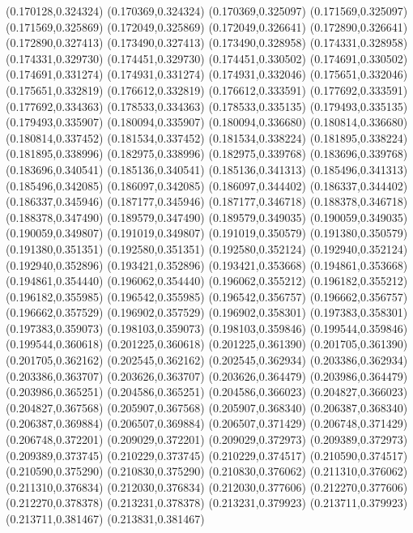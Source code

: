 (0.170128,0.324324)
(0.170369,0.324324)
(0.170369,0.325097)
(0.171569,0.325097)
(0.171569,0.325869)
(0.172049,0.325869)
(0.172049,0.326641)
(0.172890,0.326641)
(0.172890,0.327413)
(0.173490,0.327413)
(0.173490,0.328958)
(0.174331,0.328958)
(0.174331,0.329730)
(0.174451,0.329730)
(0.174451,0.330502)
(0.174691,0.330502)
(0.174691,0.331274)
(0.174931,0.331274)
(0.174931,0.332046)
(0.175651,0.332046)
(0.175651,0.332819)
(0.176612,0.332819)
(0.176612,0.333591)
(0.177692,0.333591)
(0.177692,0.334363)
(0.178533,0.334363)
(0.178533,0.335135)
(0.179493,0.335135)
(0.179493,0.335907)
(0.180094,0.335907)
(0.180094,0.336680)
(0.180814,0.336680)
(0.180814,0.337452)
(0.181534,0.337452)
(0.181534,0.338224)
(0.181895,0.338224)
(0.181895,0.338996)
(0.182975,0.338996)
(0.182975,0.339768)
(0.183696,0.339768)
(0.183696,0.340541)
(0.185136,0.340541)
(0.185136,0.341313)
(0.185496,0.341313)
(0.185496,0.342085)
(0.186097,0.342085)
(0.186097,0.344402)
(0.186337,0.344402)
(0.186337,0.345946)
(0.187177,0.345946)
(0.187177,0.346718)
(0.188378,0.346718)
(0.188378,0.347490)
(0.189579,0.347490)
(0.189579,0.349035)
(0.190059,0.349035)
(0.190059,0.349807)
(0.191019,0.349807)
(0.191019,0.350579)
(0.191380,0.350579)
(0.191380,0.351351)
(0.192580,0.351351)
(0.192580,0.352124)
(0.192940,0.352124)
(0.192940,0.352896)
(0.193421,0.352896)
(0.193421,0.353668)
(0.194861,0.353668)
(0.194861,0.354440)
(0.196062,0.354440)
(0.196062,0.355212)
(0.196182,0.355212)
(0.196182,0.355985)
(0.196542,0.355985)
(0.196542,0.356757)
(0.196662,0.356757)
(0.196662,0.357529)
(0.196902,0.357529)
(0.196902,0.358301)
(0.197383,0.358301)
(0.197383,0.359073)
(0.198103,0.359073)
(0.198103,0.359846)
(0.199544,0.359846)
(0.199544,0.360618)
(0.201225,0.360618)
(0.201225,0.361390)
(0.201705,0.361390)
(0.201705,0.362162)
(0.202545,0.362162)
(0.202545,0.362934)
(0.203386,0.362934)
(0.203386,0.363707)
(0.203626,0.363707)
(0.203626,0.364479)
(0.203986,0.364479)
(0.203986,0.365251)
(0.204586,0.365251)
(0.204586,0.366023)
(0.204827,0.366023)
(0.204827,0.367568)
(0.205907,0.367568)
(0.205907,0.368340)
(0.206387,0.368340)
(0.206387,0.369884)
(0.206507,0.369884)
(0.206507,0.371429)
(0.206748,0.371429)
(0.206748,0.372201)
(0.209029,0.372201)
(0.209029,0.372973)
(0.209389,0.372973)
(0.209389,0.373745)
(0.210229,0.373745)
(0.210229,0.374517)
(0.210590,0.374517)
(0.210590,0.375290)
(0.210830,0.375290)
(0.210830,0.376062)
(0.211310,0.376062)
(0.211310,0.376834)
(0.212030,0.376834)
(0.212030,0.377606)
(0.212270,0.377606)
(0.212270,0.378378)
(0.213231,0.378378)
(0.213231,0.379923)
(0.213711,0.379923)
(0.213711,0.381467)
(0.213831,0.381467)
